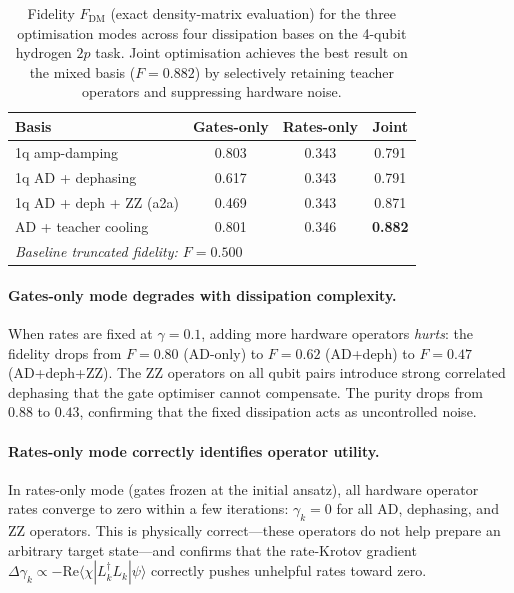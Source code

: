 \documentclass[11pt,a4paper]{article}
\begin{document}
\begin{table}[ht]
\centering
\begin{tabular}{@{}l@{\quad}c@{\quad}c@{\quad}c@{}}
\toprule
\textbf{Basis} & \textbf{Gates-only} & \textbf{Rates-only}
& \textbf{Joint} \\
\midrule
1q amp-damping
  & 0.803 & 0.343 & 0.791 \\
1q AD + dephasing
  & 0.617 & 0.343 & 0.791 \\
1q AD + deph + ZZ (a2a)
  & 0.469 & 0.343 & 0.871 \\
AD + teacher cooling
  & 0.801 & 0.346 & \textbf{0.882} \\
\midrule
\multicolumn{4}{l}{\textit{Baseline truncated fidelity: $F = 0.500$}} \\
\bottomrule
\end{tabular}
\caption{%
Fidelity $F_\text{DM}$ (exact density-matrix evaluation) for the
three optimisation modes across four dissipation bases on the 4-qubit
hydrogen $2p$ task.  Joint optimisation achieves the best result on
the mixed basis ($F = 0.882$) by selectively retaining teacher operators
and suppressing hardware noise.
}
\label{tab:rate_krotov}
\end{table}

\paragraph{Gates-only mode degrades with dissipation complexity.}
When rates are fixed at $\gamma = 0.1$, adding more hardware operators
\emph{hurts}: the fidelity drops from $F = 0.80$ (AD-only) to
$F = 0.62$ (AD+deph) to $F = 0.47$ (AD+deph+ZZ).  The ZZ operators
on all qubit pairs introduce strong correlated dephasing that the gate
optimiser cannot compensate.  The purity drops from $0.88$ to $0.43$,
confirming that the fixed dissipation acts as uncontrolled noise.

\paragraph{Rates-only mode correctly identifies operator utility.}
In rates-only mode (gates frozen at the initial ansatz), all hardware
operator rates converge to zero within a few iterations: $\gamma_k = 0$
for all AD, dephasing, and ZZ operators.  This is physically correct---these
operators do not help prepare an arbitrary target state---and confirms
that the rate-Krotov gradient
$\Delta\gamma_k \propto -\mathrm{Re}\langle\chi|L_k^\dagger L_k|\psi\rangle$
correctly pushes unhelpful rates toward zero.
\end{document}
